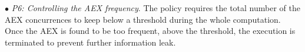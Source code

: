 


\vspace{2pt}\noindent$\bullet$\textit{ P6: Controlling the AEX frequency}. The policy requires the total number of the AEX concurrences to keep below a threshold during the whole computation. Once the AEX is found to be too frequent, above the threshold, the execution is terminated to prevent further information leak.







